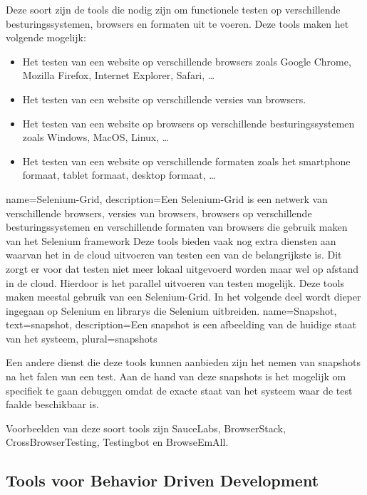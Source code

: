 Deze soort zijn de \glspl{tool} die nodig zijn om functionele testen op verschillende besturingssystemen, browsers en formaten uit te voeren. Deze \glspl{tool} maken het volgende mogelijk: 
\begin{itemize}
\item Het testen van een website op verschillende browsers zoals Google Chrome, Mozilla Firefox, Internet Explorer, Safari, \ldots
\item Het testen van een website op verschillende versies van browsers.
\item Het testen van een website op browsers op verschillende besturingssystemen zoals Windows, MacOS, Linux, \ldots
\item Het testen van een website op verschillende formaten zoals het smartphone formaat, tablet formaat, desktop formaat, \ldots
\end{itemize}
{
    name=Selenium-Grid,
    description={Een Selenium-Grid is een netwerk van verschillende browsers, versies van browsers, browsers op verschillende besturingssystemen en verschillende formaten van browsers die gebruik maken van het Selenium \gls{framework}}
}
Deze \glspl{tool} bieden vaak nog extra diensten aan waarvan het in de cloud uitvoeren van testen een van de belangrijkste is. Dit zorgt er voor dat testen niet meer lokaal uitgevoerd worden maar wel op afstand in de cloud. Hierdoor is het parallel uitvoeren van testen mogelijk. Deze \glspl{tool} maken meestal gebruik van een \gls{Selenium-Grid}. In het volgende deel wordt dieper ingegaan op Selenium en \glspl{library} die Selenium uitbreiden.
{
    name=Snapshot,
    text=snapshot,
    description={Een snapshot is een afbeelding van de huidige staat van het systeem},
    plural={snapshots}
}

Een andere dienst die deze \glspl{tool} kunnen aanbieden zijn het nemen van \glspl{snapshot} na het falen van een test. Aan de hand van deze \glspl{snapshot} is het mogelijk om specifiek te gaan debuggen omdat de exacte staat van het systeem waar de test faalde beschikbaar is.

\clearpage
Voorbeelden van deze soort \glspl{tool} zijn SauceLabs, BrowserStack, CrossBrowserTesting, Testingbot en BrowseEmAll.

\subsection{Tools voor Behavior Driven Development}

